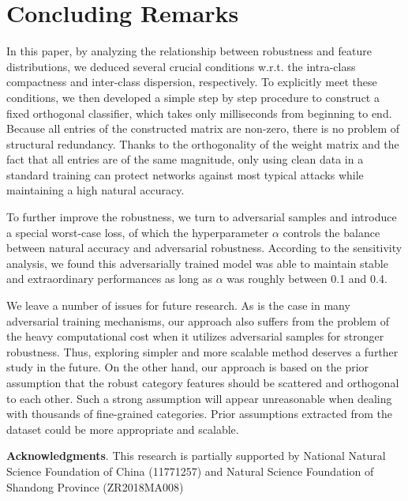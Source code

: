 \documentclass[preprint,review,12pt]{elsarticle}
\numberwithin{equation}{section}
\begin{document}
\section{Concluding Remarks}

In this paper, by analyzing the relationship between robustness and feature distributions,
we deduced several crucial  conditions w.r.t. the intra-class compactness and inter-class dispersion, respectively.
To explicitly meet these conditions,
we then developed a simple step by step procedure to construct a fixed orthogonal classifier,
which takes only milliseconds from beginning to end.
Because all entries of the constructed matrix are non-zero, there is no problem of structural redundancy.
Thanks to the orthogonality of the weight matrix and the fact that all entries are of the same magnitude,
only using clean data in a standard training can protect networks against most typical attacks while maintaining a high natural accuracy.

To further improve the robustness, we turn to adversarial samples and introduce a special worst-case loss,
of which the hyperparameter $\alpha$ controls the balance between natural accuracy and adversarial robustness.
According to the sensitivity analysis, we found this adversarially trained model was able to maintain stable and extraordinary performances
as long as $\alpha$ was roughly between 0.1 and 0.4.

We leave a number of issues for future research.
As is the case in many adversarial training mechanisms,
our approach also suffers from the problem of the heavy computational cost
when it utilizes adversarial samples for stronger robustness.
Thus, exploring simpler and more scalable method deserves a further study in the future.
On the other hand, our approach is based on the prior assumption that
the robust category features should be scattered  and  orthogonal to each other.
Such a strong assumption will appear unreasonable when dealing with thousands of fine-grained categories.
Prior assumptions extracted from the dataset could be more appropriate and scalable.


\bigskip
\textbf{Acknowledgments}. This research is partially supported by National Natural Science Foundation of China (11771257) and Natural Science Foundation of Shandong Province (ZR2018MA008)
\end{document}
